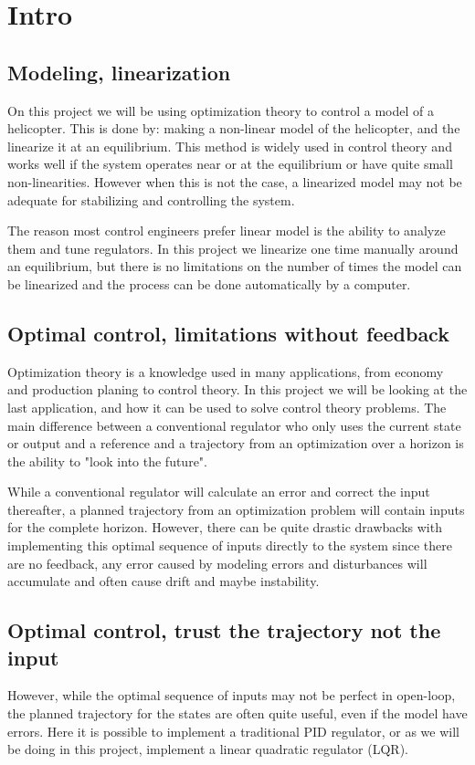 \section{Intro}
\subsection{Modeling, linearization}
On this project we will be using optimization theory to control a model of a helicopter. This is done by:
 making a non-linear model of the helicopter, and the linearize it at an equilibrium. This method is widely used in control theory and works well if the system operates near or at the equilibrium or have quite small non-linearities. However when this is not the case, a linearized model may not be adequate for stabilizing and controlling the system.

 The reason most control engineers prefer linear model is the ability to analyze them and tune regulators. In this project we linearize one time manually around an equilibrium, but there is no limitations on the number of times the model can be linearized and the process can be done automatically by a computer.

\subsection{Optimal control, limitations without feedback}
Optimization theory is a knowledge used in many applications, from economy and production planing to control theory. In this project we will be looking at the last application, and how it can be used to solve control theory problems. The main difference between a conventional regulator who only uses the current state or output and a reference and a trajectory from an optimization over a horizon is the ability to "look into the future". 

While a conventional regulator will calculate an error and correct the input thereafter, a planned trajectory from an optimization problem will contain inputs for the complete horizon. However, there can be quite drastic drawbacks with implementing this optimal sequence of inputs directly to the system since there are no feedback, any error caused by modeling errors and disturbances will accumulate and often cause drift and maybe instability.

\subsection{Optimal control, trust the trajectory not the input}
However, while the optimal sequence of inputs may not be perfect in open-loop, the planned trajectory for the states are often quite useful, even if the model have errors. Here it is possible to implement a traditional PID regulator, or as we will be doing in this project, implement a linear quadratic regulator (LQR). 

